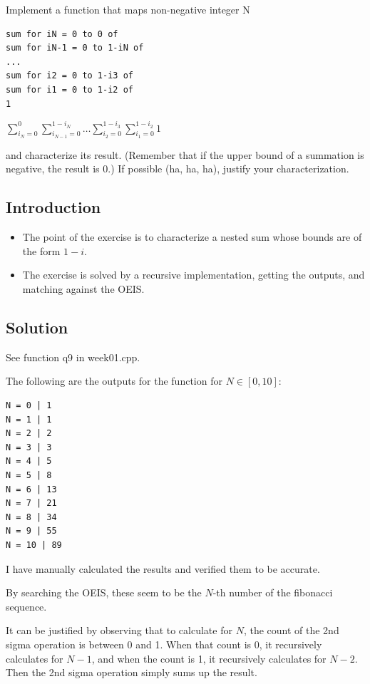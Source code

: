 \documentclass[12pt]{article}
\begin{document}
Implement a function that maps non-negative integer N

\begin{verbatim}
sum for iN = 0 to 0 of
sum for iN-1 = 0 to 1-iN of
...
sum for i2 = 0 to 1-i3 of
sum for i1 = 0 to 1-i2 of
1
\end{verbatim}

$\displaystyle\sum_{i_{N}=0}^{0}\sum_{i_{N-1}=0}^{1-i_{N}}\dots\sum_{i_{2}=0}^{1-i_{3}}\sum_{i_{1}=0}^{1-i_{2}}1$

and characterize its result. (Remember that if the upper bound of a summation is
negative, the result is 0.) If possible (ha, ha, ha), justify your
characterization.


\subsection{Introduction}

\begin{itemize}

\item
  The point of the exercise is to characterize a nested sum whose bounds are of the form $1 - i$.

\item
  The exercise is solved by a recursive implementation, getting the outputs, and matching against the OEIS.

\end{itemize}


\subsection{Solution}

See function q9 in week01.cpp.

The following are the outputs for the function for $N \in [0,10]$:

\begin{verbatim}
N = 0 | 1
N = 1 | 1
N = 2 | 2
N = 3 | 3
N = 4 | 5
N = 5 | 8
N = 6 | 13
N = 7 | 21
N = 8 | 34
N = 9 | 55
N = 10 | 89
\end{verbatim}

I have manually calculated the results and verified them to be accurate.

By searching the OEIS, these seem to be the $N$-th number of the fibonacci
sequence.

It can be justified by observing that to calculate for $N$, the count of the 2nd
sigma operation is between 0 and 1. When that count is 0, it recursively
calculates for $N-1$, and when the count is 1, it recursively calculates for
$N-2$. Then the 2nd sigma operation simply sums up the result.
\end{document}
